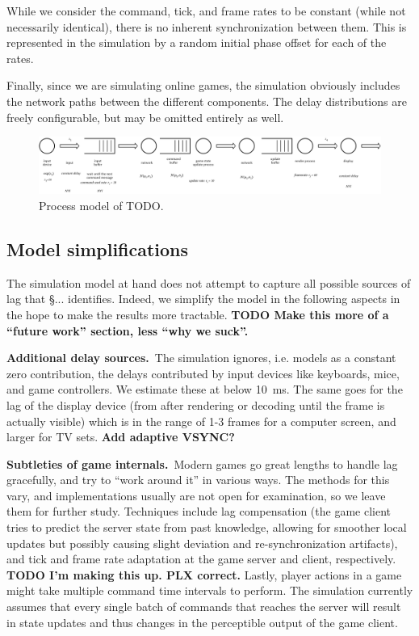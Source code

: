 While we consider the command, tick, and frame rates to be constant 
(while not necessarily identical), there is no inherent synchronization 
between them. This is represented in the simulation by a random initial 
phase offset for each of the rates.

Finally, since we are simulating online games, the simulation obviously 
includes the network paths between the different components. The delay 
distributions are freely configurable, but may be omitted entirely as well.

\begin{figure}[!t]
	\centering
	\includegraphics[width=1.0\columnwidth]{../models/e2e-lag-model.pdf}
	\caption{Process model of TODO.}
\label{fig:queuing-model}
\end{figure}



\subsection{Model simplifications}

The simulation model at hand does not attempt to capture all possible 
sources of lag that §... identifies. Indeed, we simplify the model in the 
following aspects in the hope to make the results more tractable.
\textbf{TODO Make this more of a ``future work'' section, less ``why we suck''.}

\textbf{Additional delay sources.}~The simulation ignores, i.e. 
models as a constant zero contribution, the delays contributed by 
input devices like keyboards, mice, and game controllers. We estimate 
these at below \SI{10}{\milli\second}. The same goes for the  lag of 
the display device (from after rendering or decoding until the frame 
is actually visible) which is in the range of 1-3 frames for a computer 
screen, and larger for TV sets. \textbf{Add adaptive VSYNC?}

\textbf{Subtleties of game internals.}~Modern games go great lengths 
to handle lag gracefully, and try to ``work around it'' in various ways. 
The methods for this vary, and implementations usually are not open 
for examination, so we leave them for further study. 
Techniques include lag compensation (the game client 
tries to predict the server state from past knowledge, allowing for 
smoother local updates but possibly causing slight deviation and 
re-synchronization artifacts), and tick and frame rate adaptation 
at the game server and client, respectively.
\textbf{TODO I'm making this up. PLX correct.}
Lastly, player actions in a game might take multiple command time 
intervals to perform. The simulation currently assumes that every 
single batch of commands that reaches the server will result in 
state updates and thus changes in the perceptible output of the game 
client.

